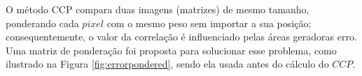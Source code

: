 O método CCP compara duas imagens (matrizes) de mesmo tamanho, 
ponderando cada $pixel$ com o mesmo peso sem importar a sua posição; 
consequentemente, o valor da correlação é influenciado pelas áreas 
geradoras erro.
Uma matriz de ponderação foi proposta para solucionar esse problema, como ilustrado na 
Figura \ref{fig:errorpondered}, sendo
ela usada antes do cálculo do $CCP$.

